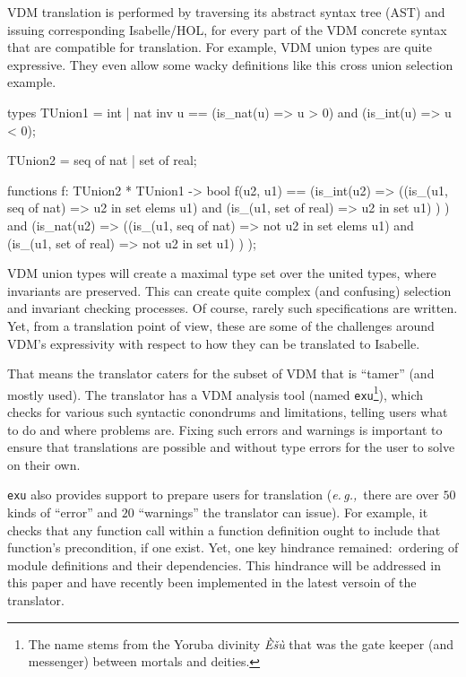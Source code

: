 \documentclass[runningheads,a4paper]{llncs}
\newcommand{\eg}{{\em e.\,g.,\/}}
\begin{document}
VDM translation is performed by traversing its abstract syntax tree (AST) and issuing corresponding Isabelle/HOL, for every part of the VDM concrete syntax that are compatible for translation. For example, VDM union types are quite expressive. They even allow some wacky definitions like this cross union selection example.
%
\begin{vdmsl}[frame=none,basicstyle=\ttfamily\scriptsize]
types
    TUnion1 = int | nat
    inv u == (is_nat(u) => u > 0) and (is_int(u) => u < 0);

    TUnion2 = seq of nat | set of real;

functions 
    f: TUnion2 * TUnion1 -> bool
	f(u2, u1) ==
		(is_int(u2) => 
			((is_(u1, seq of nat) => u2 in set elems u1)
			 and
			 (is_(u1, set of real) => u2 in set u1)
			)
		)
		and
		(is_nat(u2) => 
			((is_(u1, seq of nat) => not u2 in set elems u1)
			 and
			 (is_(u1, set of real) => not u2 in set u1)
			)
		);
\end{vdmsl}
%
VDM union types will create a maximal type set over the united types, where invariants are preserved. This can create quite complex (and confusing) selection and invariant checking processes. Of course, rarely such specifications are written. Yet, from a translation point of view, these are some of the challenges around VDM's expressivity with respect to how they can be translated to Isabelle. 

That means the translator caters for the subset of VDM that is ``tamer'' (and mostly used). The translator has a VDM analysis tool (named \texttt{exu}\footnote{The name stems from the Yoruba divinity \textit{\`{E}\v{s}\`{u}} that was the gate keeper (and messenger) between mortals and deities.}), which checks for various such syntactic conondrums and limitations, telling users what to do and where problems are. Fixing such errors and warnings is important to ensure that translations are possible and without type errors for the user to solve on their own.  

\texttt{exu} also provides support to prepare users for translation (\eg~there are over \(50\) kinds of ``error'' and \(20\) ``warnings'' the translator can issue). For example, it checks that any function call within a function definition ought to include that function's precondition, if one exist. Yet, one key hindrance remained:~ordering of module definitions and their dependencies. This hindrance will be addressed in this paper and have recently been implemented in the latest versoin of the translator. 
\end{document}
